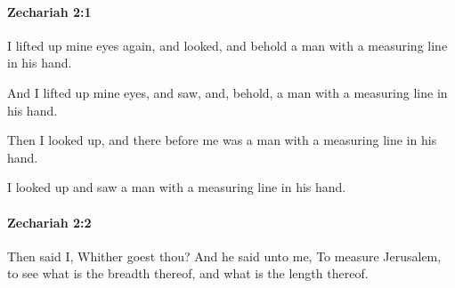 		\paragraph{Zechariah 2:1} %
			\label{ZECHARIAH-2-1}

			I lifted up mine eyes again, and looked, and behold a man with a measuring line in his hand.

			\begin{versebox}
					\item[BHS] 
					\item[LXX] 
					\item[ASV] And I lifted up mine eyes, and saw, and, behold, a man with a measuring line in his hand.
					\item[NIV] Then I looked up, and there before me was a man with a measuring line in his hand.
					\item[NRSV] I looked up and saw a man with a measuring line in his hand.
			\end{versebox}

		\paragraph{Zechariah 2:2} %
			\label{ZECHARIAH-2-2}

			Then said I, Whither goest thou? And he said unto me, To measure Jerusalem, to see what is the breadth thereof, and what is the length thereof.


